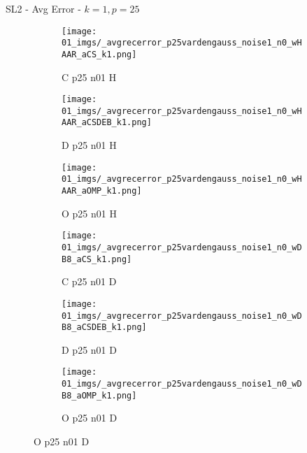 \begin{frame}{SL2 - Avg Error - $k=1,p=25$}{}
\begin{figure}
\begin{subfigure}{0.13\textwidth}
\texttt{[image: 01\_imgs/\_avgrecerror\_p25vardengauss\_noise1\_n0\_wHAAR\_aCS\_k1.png]}
\caption*{\tiny C p25 n01 H}
\end{subfigure}
\begin{subfigure}{0.13\textwidth}
\texttt{[image: 01\_imgs/\_avgrecerror\_p25vardengauss\_noise1\_n0\_wHAAR\_aCSDEB\_k1.png]}
\caption*{\tiny D p25 n01 H}
\end{subfigure}
\begin{subfigure}{0.13\textwidth}
\texttt{[image: 01\_imgs/\_avgrecerror\_p25vardengauss\_noise1\_n0\_wHAAR\_aOMP\_k1.png]}
\caption*{\tiny O p25 n01 H}
\end{subfigure}
\begin{subfigure}{0.13\textwidth}
\texttt{[image: 01\_imgs/\_avgrecerror\_p25vardengauss\_noise1\_n0\_wDB8\_aCS\_k1.png]}
\caption*{\tiny C p25 n01 D}
\end{subfigure}
\begin{subfigure}{0.13\textwidth}
\texttt{[image: 01\_imgs/\_avgrecerror\_p25vardengauss\_noise1\_n0\_wDB8\_aCSDEB\_k1.png]}
\caption*{\tiny D p25 n01 D}
\end{subfigure}
\begin{subfigure}{0.13\textwidth}
\texttt{[image: 01\_imgs/\_avgrecerror\_p25vardengauss\_noise1\_n0\_wDB8\_aOMP\_k1.png]}
\caption*{\tiny O p25 n01 D}
\end{subfigure}

\vspace{5pt}


\end{figure}
\end{frame}

